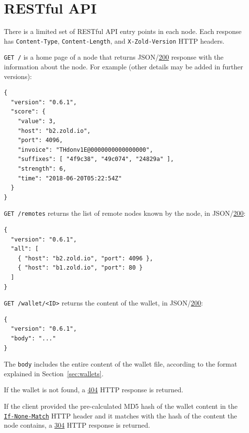 \documentclass[11pt,oneside]{article}
\newcommand\dd[1]{\colorbox{gray!30}{\texttt{#1}}}
\begin{document}
\section{RESTful API}\label{sec:api}

There is a limited set of RESTful API entry points in each node.
Each response has \dd{Content-Type},
\dd{Content-Length}, and \dd{X-Zold-Version}
HTTP headers.

\dd{GET /} is a home page of a node that returns
JSON/\href{https://www.w3.org/Protocols/rfc2616/rfc2616-sec10.html#sec10.2.1}{200}
response with the
information about the node. For example (other details may be added in
further versions):

\begin{verbatim}
{
  "version": "0.6.1",
  "score": {
    "value": 3,
    "host": "b2.zold.io",
    "port": 4096,
    "invoice": "THdonv1E@0000000000000000",
    "suffixes": [ "4f9c38", "49c074", "24829a" ],
    "strength": 6,
    "time": "2018-06-20T05:22:54Z"
  }
}
\end{verbatim}

\dd{GET /remotes} returns the list of remote nodes known by the node,
in JSON/\href{https://www.w3.org/Protocols/rfc2616/rfc2616-sec10.html#sec10.2.1}{200}:

\begin{verbatim}
{
  "version": "0.6.1",
  "all": [
    { "host": "b2.zold.io", "port": 4096 },
    { "host": "b1.zold.io", "port": 80 }
  ]
}\end{verbatim}

\dd{GET /wallet/<ID>} returns the content of the wallet, in
JSON/\href{https://www.w3.org/Protocols/rfc2616/rfc2616-sec10.html#sec10.2.1}{200}:

\begin{verbatim}
{
  "version": "0.6.1",
  "body": "..."
}\end{verbatim}

The \dd{body} includes the entire content of the wallet file, according
to the format explained in Section~\ref{sec:wallets}.

If the wallet is not found, a
\href{https://www.w3.org/Protocols/rfc2616/rfc2616-sec10.html#sec10.4.5}{404}
HTTP response is returned.

If the client provided the pre-calculated MD5 hash of the wallet content in the
\href{https://www.w3.org/Protocols/rfc2616/rfc2616-sec14.html#sec14.26}{\dd{If-None-Match}}
HTTP header and it matches with the hash of the
content the node contains, a
\href{https://www.w3.org/Protocols/rfc2616/rfc2616-sec10.html#sec10.3.5}{304} HTTP response is returned.
\end{document}
